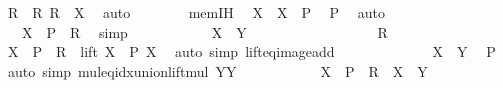 \begin{isabellebody}
\ R\ \ R{\isacharcolon}{\kern0pt}\ {\isachardoublequoteopen}R\ {\isasymin}\ X{\isachardoublequoteclose}\ \isamarkupfalse%
\ auto\isanewline
\ \ \ \ \ \ \isamarkupfalse%
\ mem{\isachardot}{\kern0pt}IH\ \isamarkupfalse%
\ {\isachardoublequoteopen}X\ {\isasymle}\ X\ {\isacharasterisk}{\kern0pt}\ P{\isachardoublequoteclose}\ \isamarkupfalse%
\ P\ \isamarkupfalse%
\ auto\isanewline
\ \ \ \ \ \ \isamarkupfalse%
\ \isamarkupfalse%
\ {\isachardoublequoteopen}{\isachardot}{\kern0pt}{\isachardot}{\kern0pt}{\isachardot}{\kern0pt}\ {\isasymle}\ X\ {\isacharasterisk}{\kern0pt}\ P\ {\isacharplus}{\kern0pt}\ R{\isachardoublequoteclose}\ \isamarkupfalse%
\ simp\isanewline
\ \ \ \ \ \ \isamarkupfalse%
\ \isamarkupfalse%
\ {\isachardoublequoteopen}{\isachardot}{\kern0pt}{\isachardot}{\kern0pt}{\isachardot}{\kern0pt}\ {\isasymle}\ X\ {\isacharasterisk}{\kern0pt}\ Y{\isachardoublequoteclose}\isanewline
\ \ \ \ \ \ \isamarkupfalse%
\ {\isacharminus}{\kern0pt}\isanewline
\ \ \ \ \ \ \ \ \isamarkupfalse%
\ R\ \isamarkupfalse%
\ {\isachardoublequoteopen}X\ {\isacharasterisk}{\kern0pt}\ P\ {\isacharplus}{\kern0pt}\ R\ {\isasymin}\ lift\ {\isacharparenleft}{\kern0pt}X\ {\isacharasterisk}{\kern0pt}\ P{\isacharparenright}{\kern0pt}\ X{\isachardoublequoteclose}\ \isamarkupfalse%
\ {\isacharparenleft}{\kern0pt}auto\ simp{\isacharcolon}{\kern0pt}\ lift{\isacharunderscore}{\kern0pt}eq{\isacharunderscore}{\kern0pt}image{\isacharunderscore}{\kern0pt}add{\isacharparenright}{\kern0pt}\isanewline
\ \ \ \ \ \ \ \ \isamarkupfalse%
\ \isamarkupfalse%
\ {\isachardoublequoteopen}{\isachardot}{\kern0pt}{\isachardot}{\kern0pt}{\isachardot}{\kern0pt}\ {\isasymsubseteq}\ X\ {\isacharasterisk}{\kern0pt}\ Y{\isachardoublequoteclose}\ \isamarkupfalse%
\ P\ \isamarkupfalse%
\ {\isacharparenleft}{\kern0pt}auto\ simp{\isacharcolon}{\kern0pt}\ mul{\isacharunderscore}{\kern0pt}eq{\isacharunderscore}{\kern0pt}idx{\isacharunderscore}{\kern0pt}union{\isacharunderscore}{\kern0pt}lift{\isacharunderscore}{\kern0pt}mul{\isacharbrackleft}{\kern0pt}\ {\isacharquery}{\kern0pt}Y{\isacharequal}{\kern0pt}Y{\isacharbrackright}{\kern0pt}{\isacharparenright}{\kern0pt}\isanewline
\ \ \ \ \ \ \ \ \isamarkupfalse%
\ \isamarkupfalse%
\ {\isachardoublequoteopen}X\ {\isacharasterisk}{\kern0pt}\ P\ {\isacharplus}{\kern0pt}\ R\ {\isasymin}\ X\ {\isacharasterisk}{\kern0pt}\ Y{\isachardoublequoteclose}\ \isacommand{{\isachardot}{\kern0pt}}\isamarkupfalse%

\end{isabellebody}

